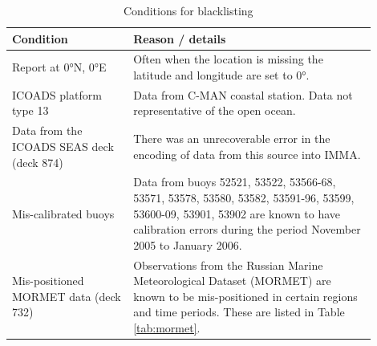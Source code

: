 \begin{table}[h]
\centering
\caption{Conditions for blacklisting}
\label{tab:blacklist}
\begin{tabular}{|p{0.3\linewidth}|p{0.6\linewidth}|}
\hline
\bfseries Condition & \bfseries Reason / details \\
\hline
Report at 0°N, 0°E & Often when the location is missing the latitude and longitude are set to 0°.\\\hline
ICOADS platform type 13 & Data from C-MAN coastal station. Data not representative of the open ocean.\\\hline
Data from the ICOADS SEAS deck (deck 874)& There was an unrecoverable error in the encoding of data from this source into IMMA.\\\hline
Mis-calibrated buoys & Data from buoys 52521, 53522, 53566-68, 53571, 53578, 53580, 53582, 53591-96, 53599, 53600-09, 53901, 53902 are known to have calibration errors during the period November 2005 to January 2006.\\\hline
Mis-positioned MORMET data (deck 732) & Observations from the Russian Marine Meteorological Dataset (MORMET) are known to be mis-positioned in certain regions and time periods. These are listed in Table \ref{tab:mormet}.\\\hline
\end{tabular}
\end{table}

